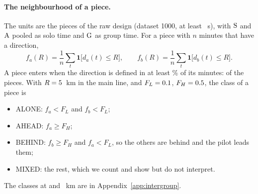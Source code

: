 \paragraph{The neighbourhood of a piece.} The units are the pieces of the raw design (dataset 1000, at least \RawShortestOne~s), with $\mathrm{S}$ and $\mathrm{A}$ pooled as solo time and $\mathrm{G}$ as group time. For a piece with $n$ minutes that have a direction,
\[
  f_a(R)=\frac1n\sum_t\mathbf{1}\bigl[d_a(t)\le R\bigr],\qquad f_b(R)=\frac1n\sum_t\mathbf{1}\bigl[d_b(t)\le R\bigr].
\]
A piece enters when the direction is defined in at least \IgMinDefined\% of its minutes: \IgPiecesUsed{} of the \IgPieces{} pieces. With $R=5$~km in the main line, and $F_L=0.1$, $F_H=0.5$, the class of a piece is
\begin{itemize}
  \item ALONE: $f_a<F_L$ and $f_b<F_L$;
  \item AHEAD: $f_a\ge F_H$;
  \item BEHIND: $f_b\ge F_H$ and $f_a<F_L$, so the others are behind and the pilot leads them;
  \item MIXED: the rest, which we count and show but do not interpret.
\end{itemize}
The classes at \IgRadLow{} and \IgRadHigh~km are in Appendix~\ref{app:intergroup}.

